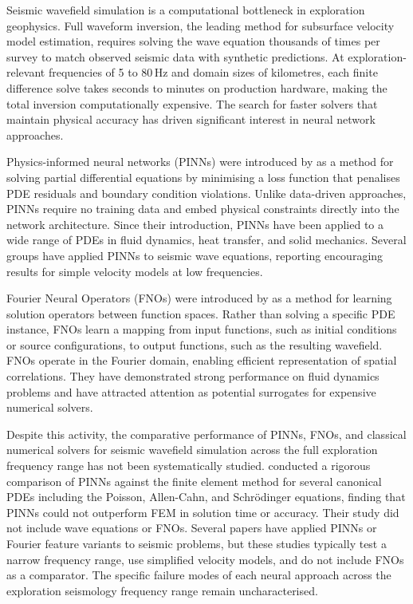\documentclass[12pt,a4paper]{article}
\begin{document}
Seismic wavefield simulation is a computational bottleneck in
exploration geophysics. Full waveform inversion, the leading
method for subsurface velocity model estimation, requires solving
the wave equation thousands of times per survey to match observed
seismic data with synthetic predictions. At exploration-relevant
frequencies of 5 to 80\,Hz and domain sizes of kilometres, each
finite difference solve takes seconds to minutes on production
hardware, making the total inversion computationally expensive.
The search for faster solvers that maintain physical accuracy has
driven significant interest in neural network approaches.

Physics-informed neural networks (PINNs) were introduced by
\citet{raissi2019} as a method for solving partial differential
equations by minimising a loss function that penalises PDE
residuals and boundary condition violations. Unlike data-driven
approaches, PINNs require no training data and embed physical
constraints directly into the network architecture. Since their
introduction, PINNs have been applied to a wide range of PDEs in
fluid dynamics, heat transfer, and solid mechanics. Several groups
have applied PINNs to seismic wave equations, reporting
encouraging results for simple velocity models at low frequencies.

Fourier Neural Operators (FNOs) were introduced by \citet{li2021}
as a method for learning solution operators between function
spaces. Rather than solving a specific PDE instance, FNOs learn
a mapping from input functions, such as initial conditions or
source configurations, to output functions, such as the resulting
wavefield. FNOs operate in the Fourier domain, enabling efficient
representation of spatial correlations. They have demonstrated
strong performance on fluid dynamics problems and have attracted
attention as potential surrogates for expensive numerical solvers.

Despite this activity, the comparative performance of PINNs,
FNOs, and classical numerical solvers for seismic wavefield
simulation across the full exploration frequency range has not
been systematically studied. \citet{grossmann2024} conducted a
rigorous comparison of PINNs against the finite element method
for several canonical PDEs including the Poisson, Allen-Cahn, and
Schr\"{o}dinger equations, finding that PINNs could not outperform
FEM in solution time or accuracy. Their study did not include wave
equations or FNOs. Several papers have applied PINNs or Fourier
feature variants to seismic problems, but these studies typically
test a narrow frequency range, use simplified velocity models, and
do not include FNOs as a comparator. The specific failure modes of
each neural approach across the exploration seismology frequency
range remain uncharacterised.
\end{document}
